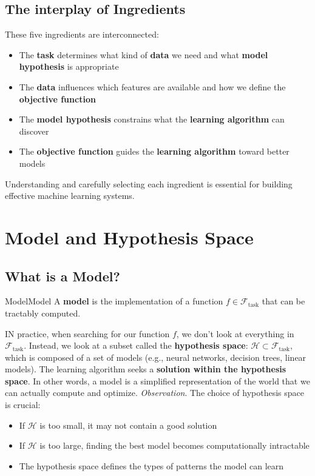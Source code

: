 \documentclass[a4paper]{article}
\theoremstyle{definition}
\begin{document}
\subsection{The interplay of Ingredients}
These five ingredients are interconnected:
\begin{itemize}
    \item The \textbf{task} determines what kind of \textbf{data} we need and what \textbf{model hypothesis} is appropriate 
    \item The \textbf{data} influences which features are available and how we define the \textbf{objective function} 
    \item The \textbf{model hypothesis} constrains what the \textbf{learning algorithm} can discover 
    \item The \textbf{objective function} guides the \textbf{learning algorithm} toward better models
\end{itemize}
Understanding and carefully selecting each ingredient is essential for building effective machine learning systems.
\section{Model and Hypothesis Space}
\subsection{What is a Model?}
\begin{definition}{Model}{Model}
A \textbf{model} is the implementation of a function \( f \in \mathcal{F}_{\text{task}} \) that can be 
tractably computed.
\end{definition}
IN practice, when searching for our function \( f \), we don't look at everything in \( \mathcal{F}_{\text{task}} \). Instead, 
we look at a subset called the \textbf{hypothesis space}: \( \mathcal{H} \subset \mathcal{F}_{\text{task}} \), which is composed of a set of models 
(e.g., neural networks, decision trees, linear models).
\vspace{1em}
\noindent
\newline
The learning algorithm seeks a \textbf{solution within the hypothesis space}. In other words, a model is a simplified 
representation of the world that we can actually compute and optimize.
\vspace{1em}
\noindent
\newline
\textit{Observation}. The choice of hypothesis space is crucial:
\begin{itemize}
    \item If \( \mathcal{H} \) is too small, it may not contain a good solution 
    \item If \( \mathcal{H} \) is too large, finding the best model becomes computationally intractable 
    \item The hypothesis space defines the types of patterns the model can learn
\end{itemize}
\end{document}
